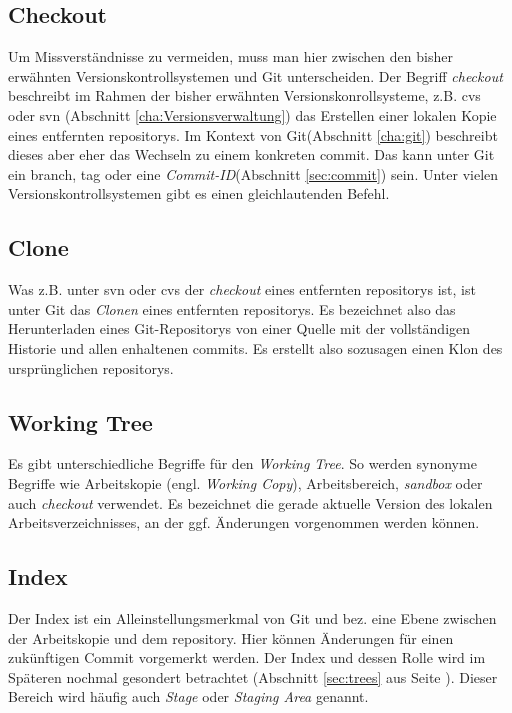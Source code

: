 \subsection{Checkout}\label{sec:checkout} Um Missverständnisse zu vermeiden,
muss man hier zwischen den bisher erwähnten Versionskontrollsystemen und Git
unterscheiden. Der Begriff \textit{checkout} beschreibt im Rahmen der bisher
erwähnten Versionskonrollsysteme, z.B. \acrshort{cvs} oder \acrshort{svn}
(Abschnitt \ref{cha:Versionsverwaltung}) das Erstellen einer lokalen Kopie
eines entfernten \glspl{repository}. Im Kontext von Git(Abschnitt
\ref{cha:git}) beschreibt dieses aber eher das Wechseln zu einem konkreten
\gls{commit}. Das kann unter Git ein \gls{branch}, \gls{tag} oder eine
\textit{Commit-ID}(Abschnitt \ref{sec:commit}) sein. Unter vielen
Versionskontrollsystemen gibt es einen gleichlautenden Befehl.

\subsection{Clone}\label{sec:clone}
Was z.B. unter \acrshort{svn} oder \acrshort{cvs} der \textit{checkout} eines
entfernten \glspl{repository} ist, ist unter Git das \textit{Clonen} eines
entfernten \glspl{repository}. Es bezeichnet also das Herunterladen eines
Git-Repositorys von einer Quelle mit der vollständigen Historie und allen
enhaltenen \glspl{commit}. Es erstellt also sozusagen einen Klon des
ursprünglichen \glspl{repository}.\cite[S.~21]{gitosp}

\subsection{Working Tree}\label{sec:workingtree} Es gibt unterschiedliche
Begriffe für den \textit{Working Tree}. So werden synonyme Begriffe wie
Arbeitskopie (engl. \textit{Working Copy}), Arbeitsbereich, \textit{sandbox}
oder auch \textit{checkout} verwendet. Es bezeichnet die gerade aktuelle
Version des lokalen Arbeitsverzeichnisses, an der ggf.  Änderungen vorgenommen
werden können.\cite[S.~20]{gitosp}

\subsection{Index}\label{sec:index}
Der Index ist ein Alleinstellungsmerkmal von Git und bez. eine Ebene zwischen
der Arbeitskopie und dem \gls{repository}. Hier können Änderungen für einen
zukünftigen Commit vorgemerkt werden\cite[S.~20]{gitosp}. Der Index und dessen
Rolle wird im Späteren nochmal gesondert betrachtet (Abschnitt \ref{sec:trees}
aus Seite \pageref{sec:trees}). Dieser Bereich wird häufig auch \textit{Stage}
oder \textit{Staging Area} genannt\cite[S.~11]{progit}.

